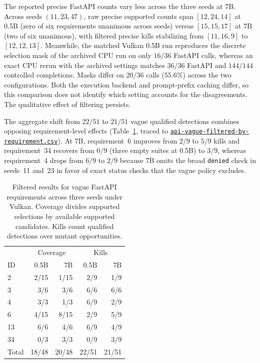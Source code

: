 The reported precise FastAPI counts vary less across the three seeds at 7B. Across seeds $(11,23,47)$, raw precise supported counts span $[12,24,14]$ at 0.5B (zero of six requirements unanimous across seeds) versus $[15,15,17]$ at 7B (two of six unanimous), with filtered precise kills stabilizing from $[11,16,9]$ to $[12,12,13]$. Meanwhile, the matched Vulkan 0.5B run reproduces the discrete selection mask of the archived CPU run on only $16/36$ FastAPI calls, whereas an exact CPU rerun with the archived settings matches $36/36$ FastAPI and $144/144$ controlled completions. Masks differ on $20/36$ calls ($55.6\%$) across the two configurations. Both the execution backend and prompt-prefix caching differ, so this comparison does not identify which setting accounts for the disagreements. The qualitative effect of filtering persists.

The aggregate shift from $22/51$ to $21/51$ vague qualified detections combines opposing requirement-level effects (Table~\ref{tab:api-scale-by-requirement}, traced to \href{https://github.com/lythean2508/Evaluating-LLM-Selected-Test-Oracles-for-Underspecified-Natural-Language-Requirements/blob/main/followup/results/api-vague-filtered-by-requirement.csv}{\texttt{api-vague-filtered-by-requirement.csv}}). At 7B, requirement~6 improves from $2/9$ to $5/9$ kills and requirement~34 recovers from $0/9$ (three empty suites at 0.5B) to $3/9$, whereas requirement~4 drops from $6/9$ to $2/9$ because 7B omits the broad \texttt{denied} check in seeds~11 and~23 in favor of exact status checks that the vague policy excludes.

\begin{table}[t]
\caption{Filtered results for vague FastAPI requirements across three seeds under Vulkan. Coverage divides supported selections by available supported candidates. Kills count qualified detections over mutant opportunities.}
\label{tab:api-scale-by-requirement}
\centering\small
\begin{tabular}{lrrrr}
\toprule
 & \multicolumn{2}{c}{Coverage} & \multicolumn{2}{c}{Kills}\\
ID & 0.5B & 7B & 0.5B & 7B\\
\midrule
2  & 2/15 & 1/15 & 2/9 & 1/9\\
3  & 3/6  & 3/6  & 6/6 & 6/6\\
4  & 3/3  & 1/3  & 6/9 & 2/9\\
6  & 4/15 & 8/15 & 2/9 & 5/9\\
13 & 6/6  & 4/6  & 6/9 & 4/9\\
34 & 0/3  & 3/3  & 0/9 & 3/9\\
\midrule
Total & 18/48 & 20/48 & 22/51 & 21/51\\
\bottomrule
\end{tabular}
\end{table}

